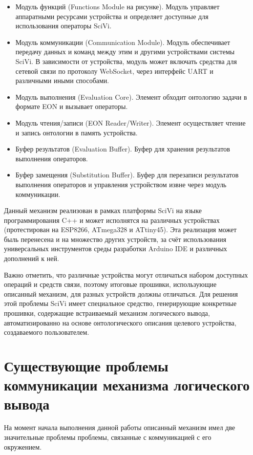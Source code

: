 \begin{itemize}
	\item Модуль функций (Functions Module на рисунке). Модуль управляет аппаратными ресурсами устройства и определяет доступные для использования операторы SciVi.
	\item Модуль коммуникации (Communication Module). Модуль обеспечивает передачу данных и команд между этим и другими устройствами системы SciVi.
	В зависимости от устройства, модуль может включать средства для сетевой связи по протоколу WebSocket, через интерфейс UART и различными иными способами.
	\item Модуль выполнения (Evaluation Core). Элемент обходит онтологию задачи в формате EON и вызывает операторы.
	\item Модуль чтения/записи (EON Reader/Writer). Элемент осуществляет чтение и запись онтологии в память устройства.
	\item Буфер результатов (Evaluation Buffer). Буфер для хранения результатов выполнения операторов.
	\item Буфер замещения (Substitution Buffer). Буфер для перезаписи результатов выполнения операторов и управления устройством извне через модуль коммуникации.
\end{itemize}

Данный механизм реализован в рамках платформы SciVi на языке программирования C++ и может исполнятся на различных устройствах (протестирован на ESP8266, ATmega328 и ATtiny45).
Эта реализация может быль перенесена и на множество других устройств, за счёт использования универсальных инструментов среды разработки Arduino IDE и различных дополнений к ней.

Важно отметить, что различные устройства могут отличаться набором доступных операций и средств связи, поэтому итоговые прошивки, использующие описанный механизм, для разных устройств должны отличаться.
Для решения этой проблемы SciVi имеет специальное средство, генерирующие конкретные прошивки, содержащие встраиваемый механизм логического вывода, автоматизированно на основе онтологического описания целевого устройства, создаваемого пользователем.

\section{Существующие проблемы коммуникации механизма логического вывода}

На момент начала выполнения данной работы описанный механизм имел две значительные проблемы проблемы, связанные с коммуникацией с его окружением.

